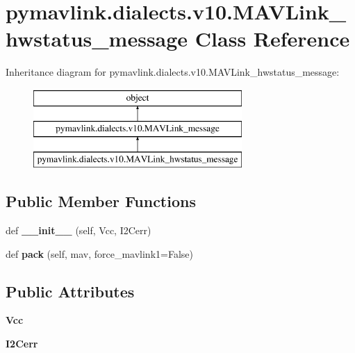 \hypertarget{classpymavlink_1_1dialects_1_1v10_1_1MAVLink__hwstatus__message}{}\section{pymavlink.\+dialects.\+v10.\+M\+A\+V\+Link\+\_\+hwstatus\+\_\+message Class Reference}
\label{classpymavlink_1_1dialects_1_1v10_1_1MAVLink__hwstatus__message}
Inheritance diagram for pymavlink.\+dialects.\+v10.\+M\+A\+V\+Link\+\_\+hwstatus\+\_\+message\+:\begin{figure}[H]
\begin{center}
\leavevmode
\includegraphics[height=3.000000cm]{classpymavlink_1_1dialects_1_1v10_1_1MAVLink__hwstatus__message}
\end{center}
\end{figure}
\subsection*{Public Member Functions}
\begin{DoxyCompactItemize}
\item 
\mbox{\label{classpymavlink_1_1dialects_1_1v10_1_1MAVLink__hwstatus__message_aa90ee723cf4425cb60af33f3af500e44}} 
def {\bfseries \+\_\+\+\_\+init\+\_\+\+\_\+} (self, Vcc, I2\+Cerr)
\item 
\mbox{\label{classpymavlink_1_1dialects_1_1v10_1_1MAVLink__hwstatus__message_a7af66153320f8bd3a7e4e9da82a28605}} 
def {\bfseries pack} (self, mav, force\+\_\+mavlink1=False)
\end{DoxyCompactItemize}
\subsection*{Public Attributes}
\begin{DoxyCompactItemize}
\item 
\mbox{\label{classpymavlink_1_1dialects_1_1v10_1_1MAVLink__hwstatus__message_a33963cbdbbad359bb55a40c62c0e85b5}} 
{\bfseries Vcc}
\item 
\mbox{\label{classpymavlink_1_1dialects_1_1v10_1_1MAVLink__hwstatus__message_a1c241b8b304989d36621a164d2f8d7ed}} 
{\bfseries I2\+Cerr}
\end{DoxyCompactItemize}
